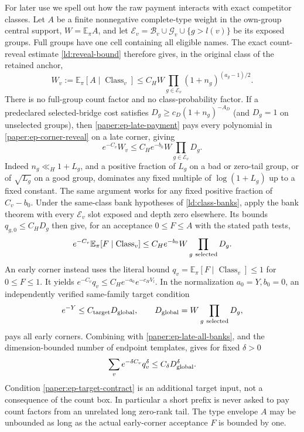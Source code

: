 For later use we spell out how the raw payment interacts with exact
competitor classes.  Let $A$ be a finite nonnegative complete-type weight
in the own-group central support, $W=\mathbb E_\pi A$, and let
$\mathcal E_v=\mathcal B_v\cup\mathcal G_v\cup\{g>l(v)\}$
be its exposed groups.  Full groups have one cell containing all eligible
names.  The exact count-reveal estimate \eqref{ld:reveal-bound} therefore
gives, in the original class of the retained anchor,
\begin{equation}\label{paper:ep-corner-reveal}
 W_v:=\mathbb E_\pi[A\mid\operatorname{Class}_v]
 \leq C_HW\prod_{g\in\mathcal E_v}(1+n_g)^{(a_g-1)/2}.
\end{equation}
There is no full-group count factor and no class-probability factor.
If a predeclared selected-bridge cost satisfies
$D_g\geq c_D(1+n_g)^{-A_D}$ (and $D_g=1$ on unselected groups),
then \eqref{paper:ep-late-payment} pays every polynomial in
\eqref{paper:ep-corner-reveal} on a late corner, giving
\begin{equation}\label{paper:ep-late-class-payment}
 e^{-C_v}W_v\leq C_He^{-b_0}W\prod_{g\in\mathcal E_v}D_g.
\end{equation}
Indeed $n_g\ll_H1+L_g$, and a positive fraction of $L_g$ on a bad or
zero-tail group, or of $\sqrt{L_g}$ on a good group, dominates any
fixed multiple of $\log(1+L_g)$ up to a fixed constant.  The same
argument works for any fixed positive fraction of $C_v-b_0$.
Under the same-class bank hypotheses of \eqref{ld:class-banks}, apply
the bank theorem with every $\mathcal E_v$ slot exposed and depth zero
elsewhere.  Its bounds $q_{g,0}\leq C_HD_g$ then give, for an
acceptance $0\leq F\leq A$ with the stated path tests,
\begin{equation}\label{paper:ep-late-all-banks}
 e^{-C_v}\mathbb E_\pi[F\mid\operatorname{Class}_v]
       \leq C_He^{-b_0}W\prod_{g\ {\rm selected}}D_g.
\end{equation}
An early corner instead uses the literal bound
$q_v=\mathbb E_\pi[F\mid\operatorname{Class}_v]\leq1$ for
$0\leq F\leq1$.  It yields
$e^{-C_v}q_v\leq C_He^{-a_0}e^{-c_HV_l}$.
In the normalization $a_0=Y,b_0=0$, an independently verified same-family
target condition
\begin{equation}\label{paper:ep-target-contract}
 e^{-Y}\leq C_{\rm target}D_{\rm global},\qquad
 D_{\rm global}=W\prod_{g\ {\rm selected}}D_g,
\end{equation}
pays all early corners.  Combining with
\eqref{paper:ep-late-all-banks}, and the dimension-bounded number of
endpoint templates, gives for fixed $\delta>0$
\[
 \sum_v e^{-\delta C_v}q_v^\delta\leq C_\delta D_{\rm global}^\delta.
\]
Condition \eqref{paper:ep-target-contract} is an additional target
input, not a consequence of the count box.  In particular a short
prefix is never asked to pay count factors from an unrelated long
zero-rank tail.  The type envelope $A$ may be unbounded as long as the
actual early-corner acceptance $F$ is bounded by one.


